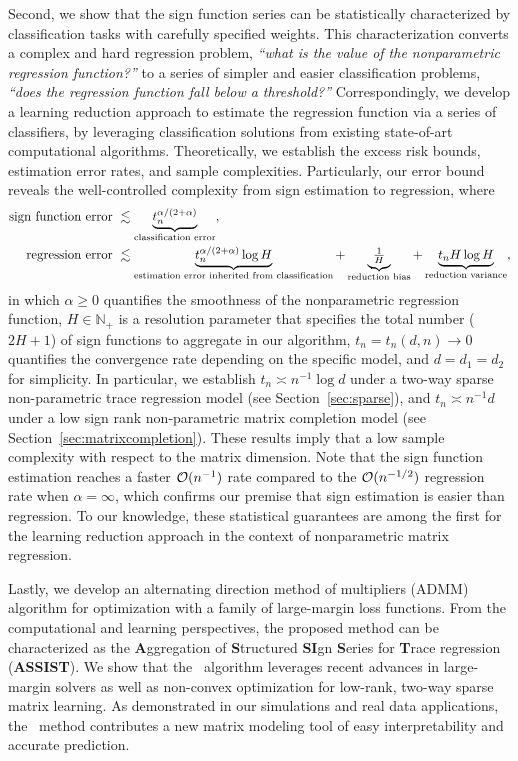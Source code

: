 \documentclass[11pt]{article}
\newcommand*{\KeepStyleUnderBrace}[1]{%
\mathop{%
\mathchoice
{\underbrace{\displaystyle#1}}%
{\underbrace{\textstyle#1}}%
{\underbrace{\scriptstyle#1}}%
{\underbrace{\scriptscriptstyle#1}}%
}\limits
}
\theoremstyle{plain}
\theoremstyle{definition}
\def\NonparaM{\text{\bf \footnotesize ASSIST}}
\begin{document}
Second, we show that the sign function series can be statistically characterized by classification tasks with carefully specified weights. This characterization converts a complex and hard regression problem, \emph{``what is the value of the nonparametric regression function?''} to a series of simpler and easier classification problems, \emph{``does the regression function fall below a threshold?''} Correspondingly, we develop a learning reduction approach to estimate the regression function via a series of classifiers, by leveraging classification solutions from existing state-of-art computational algorithms. Theoretically, we establish the excess risk bounds, estimation error rates, and sample complexities. Particularly, our error bound reveals the well-controlled complexity from sign estimation to regression, where 
\vspace{-0.01in}
\begin{align*}
\text{sign function error }& \lesssim \KeepStyleUnderBrace{t_n^{\alpha/( 2+\alpha)}}_{\text{classification error}},\\
\text{regression error } & \lesssim  \KeepStyleUnderBrace{t_n^{\alpha/(2+\alpha)}\log H}_{\text{estimation error inherited from classification}}+\KeepStyleUnderBrace{\textstyle{1\over H}}_{\text{reduction bias}}+\KeepStyleUnderBrace{t_nH\log H}_{\text{reduction variance}},
\end{align*}
in which $\alpha\geq 0$ quantifies the smoothness of the nonparametric regression function, $H\in\mathbb{N}_{+}$ is a resolution parameter that specifies the total number ($2H+1$) of sign functions to aggregate in our algorithm, $t_n=t_n(d,n)\to 0$ quantifies the convergence rate depending on the specific model, and $d=d_1=d_2$ for simplicity. In particular, we establish $t_n\asymp n^{-1}\log d$ under a two-way sparse non-parametric trace regression model (see Section~\ref{sec:sparse}), and $t_n \asymp n^{-1}d$ under a low sign rank non-parametric matrix completion model (see Section~\ref{sec:matrixcompletion}). These results imply that a low sample complexity with respect to the matrix dimension. Note that the sign function estimation reaches a faster $\mathcal{O}(n^{-1})$ rate compared to the $\mathcal{O}(n^{-1/2})$ regression rate when $\alpha= \infty$, which confirms our premise that sign estimation is easier than regression. To our knowledge, these statistical guarantees are among the first for the learning reduction approach in the context of nonparametric matrix regression. 

Lastly, we develop an alternating direction method of multipliers (ADMM) algorithm for optimization with a family of large-margin loss functions. From the computational and learning perspectives, the proposed method can be characterized as the {\bf \small  A}ggregation of {\bf \small  S}tructured {\bf \small  SI}gn {\bf \small  S}eries for {\bf \small T}race regression ({\bf \footnotesize ASSIST}). We show that the \NonparaM\ algorithm leverages recent advances in large-margin solvers as well as non-convex optimization for low-rank, two-way sparse matrix learning. As demonstrated in our simulations and real data applications, the \NonparaM\ method contributes a new matrix modeling tool of easy interpretability and accurate prediction. 
\end{document}
